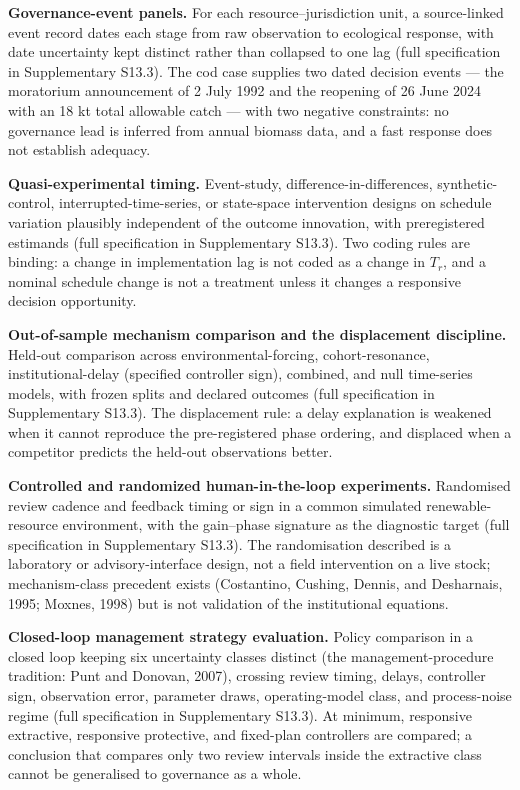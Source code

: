\documentclass[11pt]{article}
\begin{document}
\textbf{Governance-event panels.} For each resource--jurisdiction unit, a source-linked event record dates each stage from raw observation to ecological response, with date uncertainty kept distinct rather than collapsed to one lag (full specification in Supplementary S13.3). The cod case supplies two dated decision events --- the moratorium announcement of 2 July 1992 and the reopening of 26 June 2024 with an 18 kt total allowable catch --- with two negative constraints: no governance lead is inferred from annual biomass data, and a fast response does not establish adequacy.

\textbf{Quasi-experimental timing.} Event-study, difference-in-differences, synthetic-control, interrupted-time-series, or state-space intervention designs on schedule variation plausibly independent of the outcome innovation, with preregistered estimands (full specification in Supplementary S13.3). Two coding rules are binding: a change in implementation lag is not coded as a change in \(T_r\), and a nominal schedule change is not a treatment unless it changes a responsive decision opportunity.

\textbf{Out-of-sample mechanism comparison and the displacement
discipline.} Held-out comparison across environmental-forcing, cohort-resonance, institutional-delay (specified controller sign), combined, and null time-series models, with frozen splits and declared outcomes (full specification in Supplementary S13.3). The displacement rule: a delay explanation is weakened when it cannot reproduce the pre-registered phase ordering, and displaced when a competitor predicts the held-out observations better.

\textbf{Controlled and randomized human-in-the-loop experiments.} Randomised review cadence and feedback timing or sign in a common simulated renewable-resource environment, with the gain--phase signature as the diagnostic target (full specification in Supplementary S13.3). The randomisation described is a laboratory or advisory-interface design, not a field intervention on a live stock; mechanism-class precedent exists (Costantino, Cushing, Dennis, and Desharnais, 1995; Moxnes, 1998) but is not validation of the institutional equations.

\textbf{Closed-loop management strategy evaluation.} Policy comparison in a closed loop keeping six uncertainty classes distinct (the management-procedure tradition: Punt and Donovan, 2007), crossing review timing, delays, controller sign, observation error, parameter draws, operating-model class, and process-noise regime (full specification in Supplementary S13.3). At minimum, responsive extractive, responsive protective, and fixed-plan controllers are compared; a conclusion that compares only two review intervals inside the extractive class cannot be generalised to governance as a whole.
\end{document}
